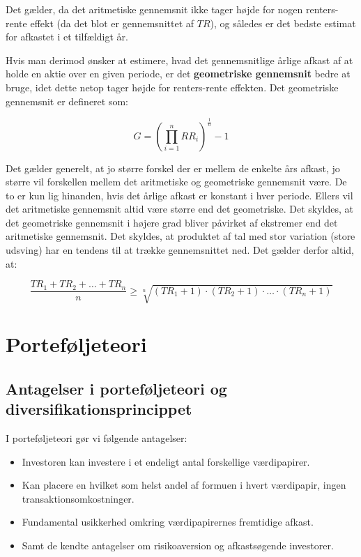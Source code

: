 \documentclass[10pt,reqno, usenames]{article}
\begin{document}
Det gælder, da det aritmetiske gennemsnit ikke tager højde for nogen renters-rente effekt (da det blot er gennemsnittet af $TR$), og således er det bedste estimat for afkastet i et tilfældigt år. 

\vspace{10 pt}

Hvis man derimod ønsker at estimere, hvad det gennemsnitlige årlige afkast af at holde en aktie over en given periode, er det \textbf{geometriske gennemsnit} bedre at bruge, idet dette netop tager højde for renters-rente effekten. Det geometriske gennemsnit er defineret som: 

\begin{equation}
    G = \left( \prod_{i=1}^{n} RR_i \right)^{\frac{1}{n}} - 1
\end{equation}

Det gælder generelt, at jo større forskel der er mellem de enkelte års afkast, jo større vil forskellen mellem det aritmetiske og geometriske gennemsnit være. De to er kun lig hinanden, hvis det årlige afkast er konstant i hver periode. Ellers vil det aritmetiske gennemsnit altid være større end det geometriske. Det skyldes, at det geometriske gennemsnit i højere grad bliver påvirket af ekstremer end det aritmetiske gennemsnit. Det skyldes, at produktet af tal med stor variation (store udsving) har en tendens til at trække gennemsnittet ned. Det gælder derfor altid, at: 

\begin{equation}
\frac{TR_1 + TR_2 + \ldots + TR_n}{n} \geq \sqrt[n]{(TR_1+1) \cdot (TR_2+1) \cdot \ldots \cdot (TR_n+1)}
\end{equation}

\section{Porteføljeteori}
\subsection{Antagelser i porteføljeteori og diversifikationsprincippet}
I porteføljeteori gør vi følgende antagelser: 

\begin{itemize}
    \item Investoren kan investere i et endeligt antal forskellige
værdipapirer. 
\item Kan placere en hvilket som helst andel af formuen i hvert
værdipapir, ingen transaktionsomkostninger.
\item Fundamental usikkerhed omkring værdipapirernes
fremtidige afkast.
\item Samt de kendte antagelser om risikoaversion og afkastsøgende investorer.
\end{itemize}
\end{document}
